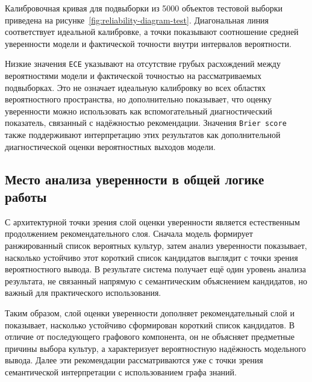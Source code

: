 

Калибровочная кривая для подвыборки из 5000 объектов тестовой выборки приведена на рисунке~\ref{fig:reliability-diagram-test}. Диагональная
линия соответствует идеальной калибровке, а точки показывают соотношение средней уверенности модели и фактической
точности внутри интервалов вероятности.



Низкие значения \texttt{ECE} указывают на отсутствие грубых расхождений между вероятностями модели и фактической
точностью на рассматриваемых подвыборках. Это не означает идеальную калибровку во всех областях вероятностного
пространства, но дополнительно показывает, что оценку уверенности можно использовать как вспомогательный
диагностический показатель, связанный с надёжностью рекомендации. Значения \texttt{Brier\ score} также поддерживают
интерпретацию этих результатов как дополнительной диагностической оценки вероятностных выходов модели.

\subsection{Место анализа уверенности в общей логике работы}

С архитектурной точки зрения слой оценки уверенности является естественным продолжением рекомендательного слоя. Сначала
модель формирует ранжированный список вероятных культур, затем анализ уверенности показывает, насколько устойчиво этот
короткий список кандидатов выглядит с точки зрения вероятностного вывода. В результате система получает ещё один
уровень анализа результата, не связанный напрямую с семантическим объяснением кандидатов, но важный для практического
использования.

Таким образом, слой оценки уверенности дополняет рекомендательный слой и показывает, насколько устойчиво сформирован
короткий список кандидатов. В отличие от последующего графового компонента, он не объясняет предметные причины выбора
культур, а характеризует вероятностную надёжность модельного вывода. Далее эти рекомендации рассматриваются уже с точки
зрения семантической интерпретации с использованием графа знаний.
